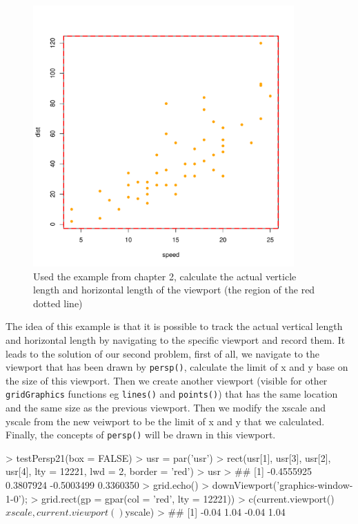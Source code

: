 \documentclass[paper=a4, fontsize=11pt]{report}
\begin{document}
\begin{figure}[h]
\begin{center}
  \includegraphics[height = 10cm, width = 10cm]{figure/gridGraphics_persp_demo_1.pdf}
  \caption{Used the example from chapter 2, calculate the actual verticle length and horizontal length of the viewport (the region of the red dotted line)}
  	\label{figure_4.2}
\end{center}
\end{figure}

\newpage
The idea of this example is that it is possible to track the actual vertical length and horizontal length by navigating to the specific viewport and record them. It leads to the solution of our second problem, first of all, we navigate to the viewport that has been drawn by \texttt{persp()}, calculate the limit of x and y base on the size of this viewport. Then we create another viewport (visible for other \texttt{gridGraphics} functions eg \texttt{lines()} and \texttt{points()}) that has the same location and the same size as the previous viewport. Then we modify the xscale and yscale from the new veiwport to be the limit of x and y that we calculated. Finally, the concepts of \texttt{persp()} will be drawn in this viewport. \\

\begin{Schunk}
\begin{Sinput}
> testPersp21(box = FALSE)
> usr = par('usr')
> rect(usr[1], usr[3], usr[2], usr[4], lty = 12221, lwd = 2, border = 'red')
> usr
> ## [1] -0.4555925  0.3807924 -0.5003499  0.3360350
> grid.echo()
> downViewport('graphics-window-1-0'); 
> grid.rect(gp = gpar(col = 'red', lty = 12221))
> c(current.viewport()$xscale, current.viewport()$yscale)
> ## [1] -0.04  1.04 -0.04  1.04
\end{Sinput}
\end{Schunk}
\end{document}
